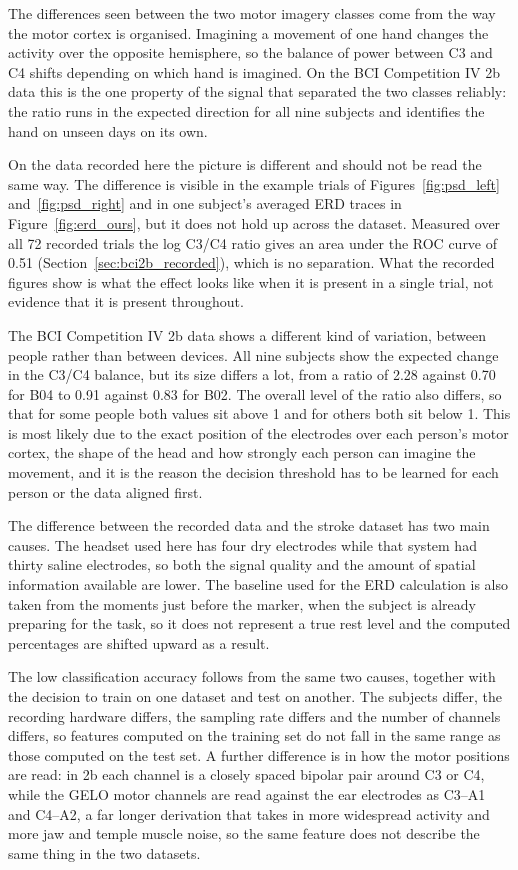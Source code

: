 The differences seen between the two motor imagery classes come from the way the motor
cortex is organised. Imagining a movement of one hand changes the activity over the
opposite hemisphere, so the balance of power between C3 and C4 shifts depending on which
hand is imagined. On the BCI Competition IV 2b data this is the one property of the signal
that separated the two classes reliably: the ratio runs in the expected direction for all
nine subjects and identifies the hand on unseen days on its own.

On the data recorded here the picture is different and should not be read the same way.
The difference is visible in the example trials of Figures~\ref{fig:psd_left}
and~\ref{fig:psd_right} and in one subject's averaged ERD traces in
Figure~\ref{fig:erd_ours}, but it does not hold up across the dataset. Measured over all
72 recorded trials the log C3/C4 ratio gives an area under the ROC curve of 0.51
(Section~\ref{sec:bci2b_recorded}), which is no separation. What the recorded figures show
is what the effect looks like when it is present in a single trial, not evidence that it
is present throughout.

The BCI Competition IV 2b data shows a different kind of variation, between people
rather than between devices. All nine subjects show the expected change in the C3/C4
balance, but its size differs a lot, from a ratio of 2.28 against 0.70 for B04 to 0.91
against 0.83 for B02. The overall level of the ratio also differs, so that for some
people both values sit above 1 and for others both sit below 1. This is most likely due
to the exact
position of the electrodes over each person's motor cortex, the shape of the head and how
strongly each person can imagine the movement, and it is the reason the decision threshold has to
be learned for each person or the data aligned first.

The difference between the recorded data and the stroke dataset has two main causes. The
headset used here has four dry electrodes while that system had thirty saline
electrodes, so both the signal quality and the amount of spatial information available are
lower. The baseline used for the ERD calculation is also taken from the moments just before
the marker, when the subject is already preparing for the task, so it does not represent a
true rest level and the computed percentages are shifted upward as a result.

The low classification accuracy follows from the same two causes, together with the
decision to train on one dataset and test on another. The subjects differ, the recording
hardware differs, the sampling rate differs and the number of channels differs, so features
computed on the training set do not fall in the same range as those computed on the test
set. A further difference is in how the motor positions are read: in 2b each channel is a
closely spaced bipolar pair around C3 or C4, while the GELO motor channels are read
against the ear electrodes as C3--A1 and C4--A2, a far longer derivation that takes in more
widespread activity and more jaw and temple muscle noise, so the same feature does not
describe the same thing in the two datasets.

